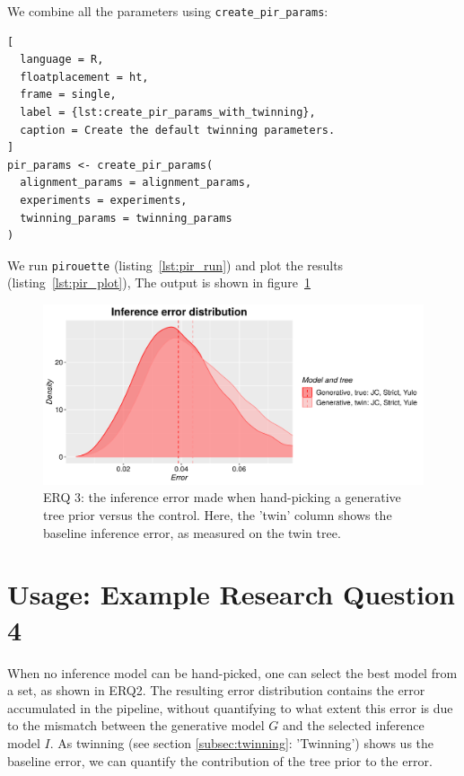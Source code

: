 \documentclass{article}
\begin{document}
We combine all the parameters using \verb;create_pir_params;:

\begin{lstlisting}[
  language = R,
  floatplacement = ht,
  frame = single,
  label = {lst:create_pir_params_with_twinning},
  caption = Create the default twinning parameters.
]
pir_params <- create_pir_params(
  alignment_params = alignment_params,
  experiments = experiments,
  twinning_params = twinning_params
)
\end{lstlisting}

We run \verb;pirouette; (listing~\ref{lst:pir_run}) 
and plot the results (listing~\ref{lst:pir_plot}),
The output is shown in figure~\ref{fig:example_3}

\begin{figure}[H]
  \includegraphics[width=\textwidth]{example_3/errors.png}
  \caption{
    ERQ 3: the inference error made 
    when hand-picking a generative tree prior versus the control.
    Here, the 'twin' column shows the baseline inference error,
    as measured on the twin tree.
  }
  \label{fig:example_3}
\end{figure}

\section{Usage: Example Research Question 4}

When no inference model can be hand-picked, 
one can select the best model from a set,
as shown in ERQ2.
The resulting error distribution contains the error accumulated in the pipeline,
without quantifying to what extent this error is due to the mismatch between 
the generative model $\mathit{G}$ and the selected inference model 
$\mathit{I}$.
As twinning (see section \ref{subsec:twinning}: 'Twinning') shows us the baseline error, we can quantify the contribution of the tree prior to the error.
\end{document}
